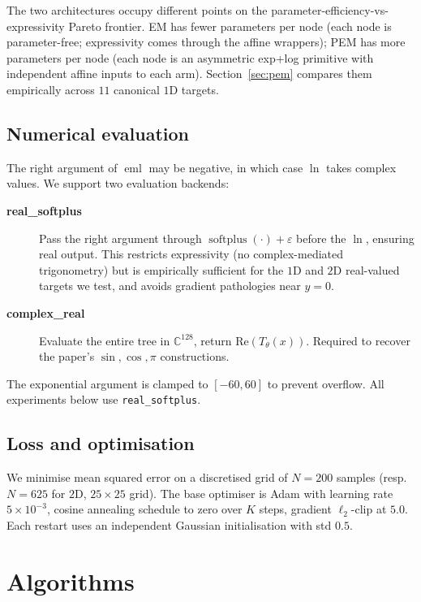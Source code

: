 \documentclass[11pt]{article}
\newcommand{\eml}{\operatorname{eml}}
\begin{document}
The two architectures occupy different points on the
parameter-efficiency-vs-expressivity Pareto frontier. EM has fewer
parameters per node (each node is parameter-free; expressivity comes
through the affine wrappers); PEM has more parameters per node (each node
is an asymmetric exp+log primitive with independent affine inputs to each
arm). Section~\ref{sec:pem} compares them empirically across $11$ canonical
$1$D targets.

\subsection{Numerical evaluation}

The right argument of $\eml$ may be negative, in which case $\ln$ takes complex
values. We support two evaluation backends:
\begin{description}
\item[\textbf{real\_softplus}] Pass the right argument through
  $\operatorname{softplus}(\cdot) + \varepsilon$ before the $\ln$, ensuring real
  output. This restricts expressivity (no complex-mediated
  trigonometry) but is empirically sufficient for the $1$D and $2$D real-valued
  targets we test, and avoids gradient pathologies near $y = 0$.
\item[\textbf{complex\_real}] Evaluate the entire tree in $\mathbb{C}^{128}$,
  return $\mathrm{Re}(T_\theta(x))$. Required to recover the paper's
  $\sin, \cos, \pi$ constructions.
\end{description}
The exponential argument is clamped to $[-60, 60]$ to prevent overflow. All
experiments below use \texttt{real\_softplus}.

\subsection{Loss and optimisation}

We minimise mean squared error on a discretised grid of $N = 200$ samples
(resp.\ $N = 625$ for $2$D, $25 \times 25$ grid). The base optimiser is
Adam\cite{adam} with learning rate $5 \times 10^{-3}$, cosine annealing schedule
to zero over $K$ steps, gradient $\ell_2$-clip at $5.0$. Each restart uses an
independent Gaussian initialisation with std $0.5$.

\section{Algorithms}
\end{document}
